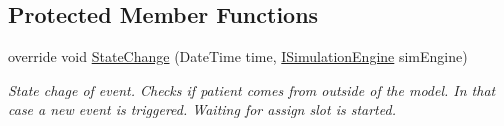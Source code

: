 \subsection*{Protected Member Functions}
\begin{DoxyCompactItemize}
\item 
override void \hyperlink{class_general_health_care_elements_1_1_department_models_1_1_outpatient_1_1_waiting_list_1_1_eveb69cba3dbb99690008a282b7e42002d2_ae40affb64afb616011a473742e921987}{State\+Change} (Date\+Time time, \hyperlink{interface_simulation_core_1_1_simulation_classes_1_1_i_simulation_engine}{I\+Simulation\+Engine} sim\+Engine)
\begin{DoxyCompactList}\small\item\em State chage of event. Checks if patient comes from outside of the model. In that case a new event is triggered. Waiting for assign slot is started. \end{DoxyCompactList}\end{DoxyCompactItemize}
